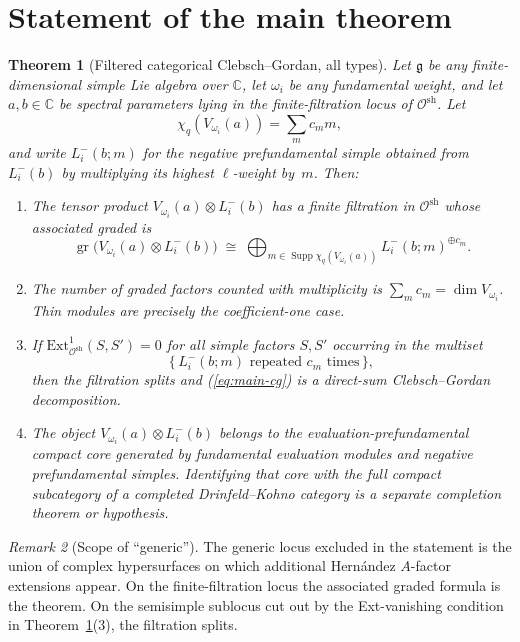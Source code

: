 \documentclass[11pt,reqno]{amsart}
\newtheorem{theorem}{Theorem}[section]
\theoremstyle{definition}
\theoremstyle{remark}
\newtheorem{remark}[theorem]{Remark}
\newcommand{\cO}{\mathcal{O}}
\newcommand{\fg}{\mathfrak{g}}
\newcommand{\Ext}{\mathrm{Ext}}
\DeclareMathOperator{\gr}{gr}
\numberwithin{equation}{section}
\begin{document}
\section{Statement of the main theorem}\label{sec:statement}

\begin{theorem}[Filtered categorical Clebsch--Gordan, all types]
\label{thm:main-formal}
Let $\fg$ be any finite-dimensional simple Lie algebra over
$\mathbb{C}$, let $\omega_i$ be any fundamental weight, and let
$a, b \in \mathbb{C}$ be spectral parameters lying in the
finite-filtration locus of $\cO^{\mathrm{sh}}$. Let
\[
\chi_q(V_{\omega_i}(a))=\sum_m c_m m,
\]
and write $L^-_i(b;m)$ for the negative prefundamental simple
obtained from $L^-_i(b)$ by multiplying its highest $\ell$-weight
by~$m$.
Then:
\begin{enumerate}[label=\textup{(\arabic*)}]
\item The tensor product $V_{\omega_i}(a)\otimes L^-_i(b)$ has a
finite filtration in $\cO^{\mathrm{sh}}$ whose associated graded is
\begin{equation}\label{eq:main-cg}
\gr\bigl(V_{\omega_i}(a) \otimes L^-_i(b)\bigr)
 \;\cong\;
 \bigoplus_{m\in \operatorname{Supp}\chi_q(V_{\omega_i}(a))}
 L^-_i(b;m)^{\oplus c_m}.
\end{equation}
\item The number of graded factors counted with multiplicity is
$\sum_m c_m=\dim V_{\omega_i}$. Thin modules are precisely the
coefficient-one case.
\item If
$\Ext^1_{\cO^{\mathrm{sh}}}(S,S')=0$ for all simple factors
$S,S'$ occurring in the multiset
\[
\{\,L^-_i(b;m) \text{ repeated } c_m \text{ times}\,\},
\]
then the filtration splits and (\ref{eq:main-cg}) is a
direct-sum Clebsch--Gordan decomposition.
\item The object $V_{\omega_i}(a)\otimes L^-_i(b)$ belongs to the
evaluation-prefundamental compact core generated by fundamental
evaluation modules and negative prefundamental simples. Identifying
that core with the full compact subcategory of a completed
Drinfeld--Kohno category is a separate completion theorem or
hypothesis.
\end{enumerate}
\end{theorem}

\begin{remark}[Scope of ``generic'']
\label{rem:generic-scope}
The generic locus excluded in the statement is the union of
complex hypersurfaces on which additional Hern\'andez $A$-factor
extensions appear. On the finite-filtration locus the associated
graded formula is the theorem. On the semisimple sublocus cut out
by the Ext-vanishing condition in
Theorem~\ref{thm:main-formal}(3), the filtration splits.
\end{remark}
\end{document}
